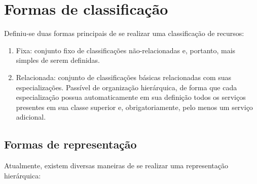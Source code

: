 \section{Formas de classificação}

Definiu-se duas formas principais de se realizar uma classificação de recursos:

\begin{enumerate}
	\item Fixa: conjunto fixo de classificações não-relacionadas e, portanto, mais simples de serem definidas.

	\item Relacionada: conjunto de classificações básicas relacionadas com suas especializações. Passível de organização hierárquica, de forma que cada especialização possua automaticamente em sua definição todos os serviços presentes em sua classe superior e, obrigatoriamente, pelo menos um serviço adicional.
\end{enumerate}

\subsection{Formas de representação}

Atualmente, existem diversas maneiras de se realizar uma representação hierárquica:

